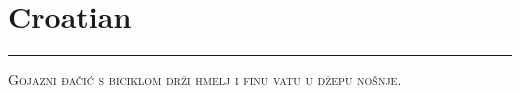 
\vspace{-1em}\section*{\checkyes Croatian}
\vspace{-.5em}\hrule\vspace{.5em}
\noindent\textsc{Gojazni đačić s biciklom drži hmelj i finu vatu u džepu nošnje.}